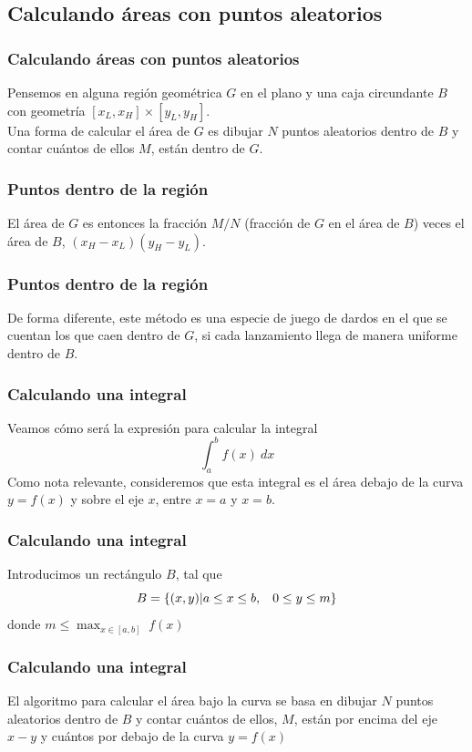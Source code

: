 \subsection{Calculando áreas con puntos aleatorios}
\begin{frame}
\frametitle{Calculando áreas con puntos aleatorios}
Pensemos en alguna región geométrica $G$ en el plano y una caja circundante $B$ con geometría $[x_{L}, x_{H}] \times [y_{L}, y_{H}]$.
\\
\bigskip
Una forma de calcular el área de $G$ es dibujar $N$ puntos aleatorios dentro de $B$ y contar cuántos de ellos $M$, están dentro de $G$.
\end{frame}
\begin{frame}
\frametitle{Puntos dentro de la región}
El área de $G$ es entonces la fracción $M/N$ (fracción de $G$ en el área de $B$) veces el área de $B$, $(x_{H} - x_{L})(y_{H} - y_{L})$.
\end{frame}
\begin{frame}
\frametitle{Puntos dentro de la región}
De forma diferente, este método es una especie de juego de dardos en el que se cuentan los que caen dentro de $G$, si cada lanzamiento llega de manera uniforme dentro de $B$.
\end{frame}
\begin{frame}
\frametitle{Calculando una integral}
Veamos cómo será la expresión para calcular la integral
\[ \int_{a}^{b} f(x) \: dx \]
Como nota relevante, consideremos que esta integral es el área debajo de la curva $y = f(x)$ y sobre el eje $x$, entre $x = a$ y $x = b$.
\end{frame}
\begin{frame}
\frametitle{Calculando una integral}
Introducimos un rectángulo $B$, tal que
\[ B = \{ (x, y) \vert a \leq x \leq b, \hspace{0.3cm} 0 \leq y \leq m \} \]
donde $m \leq \max_{x \in [a, b]} \; f(x)$
\end{frame}
\begin{frame}
\frametitle{Calculando una integral}
El algoritmo para calcular el área bajo la curva se basa en dibujar $N$ puntos aleatorios dentro de $B$ y contar cuántos de ellos, $M$, están por encima del eje $x-y$  y cuántos por debajo de la curva $y=f(x)$
\end{frame}
